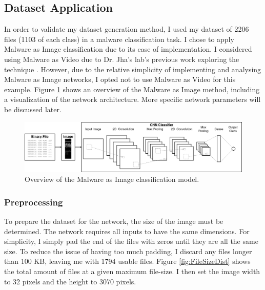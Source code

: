 \documentclass[12pt, letterpaper, titlepage]{article}
\newcommand{\figRef}[1]{Figure \ref{#1}}
\newcommand{\benignFiles}{1103}
\newcommand{\totalFiles}{2206}
\newcommand{\usableFiles}{1794}
\newcommand{\maxFileSize}{100 KB}
\newcommand{\imageWidth}{32}
\newcommand{\imageHeight}{3070}
\begin{document}
\subsection{Dataset Application}
In order to validate my dataset generation method, I used my dataset of \totalFiles{} files (\benignFiles{} of each class) in a malware classification task.
I chose to apply Malware as Image classification due to its ease of implementation.
I considered using Malware as Video due to Dr. Jha's lab's previous work exploring the technique \cite{SantacroceMaV, SantacroceSalience}.
However, due to the relative simplicity of implementing and analysing Malware as Image networks, I opted not to use Malware as Video for this example.
\figRef{fig:MaI} shows an overview of the Malware as Image method, including a visualization of the network architecture.
More specific network parameters will be discussed later.

\begin{figure}[H]
  \centering
  \includegraphics[width=\textwidth, keepaspectratio]{Images/Malware_as_Image.png}
  \caption{Overview of the Malware as Image classification model.}
  \label{fig:MaI}
\end{figure}

\subsubsection{Preprocessing}
To prepare the dataset for the network, the size of the image must be determined.
The network requires all inputs to have the same dimensions.
For simplicity, I simply pad the end of the files with zeros until they are all the same size.
To reduce the issue of having too much padding, I discard any files longer than \maxFileSize{}, leaving me with \usableFiles{} usable files.
\figRef{fig:FileSizeDist} shows the total amount of files at a given maximum file-size.
I then set the image width to \imageWidth{} pixels and the height to \imageHeight{} pixels.
\end{document}
